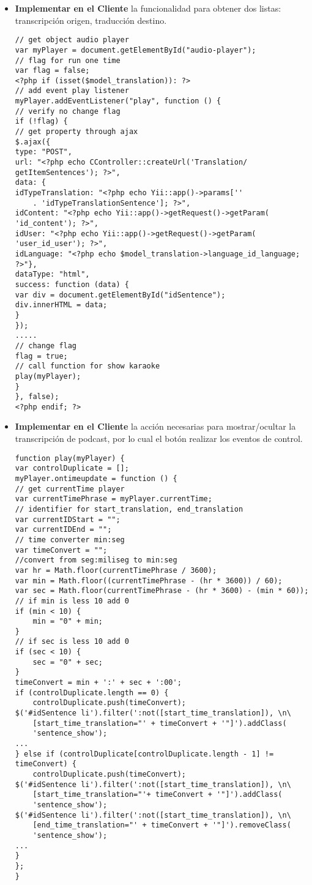 \begin{itemize}

\item \textbf{Implementar en el Cliente} la funcionalidad para obtener dos
listas: transcripción origen, traducción destino.

\begin{lstlisting}[caption={Llenado de elementos en subtitulado.}, label={lst:fillSubtitle}]
// get object audio player
var myPlayer = document.getElementById("audio-player");
// flag for run one time
var flag = false;
<?php if (isset($model_translation)): ?>
// add event play listener
myPlayer.addEventListener("play", function () {
// verify no change flag
if (!flag) {
// get property through ajax
$.ajax({
type: "POST",
url: "<?php echo CController::createUrl('Translation/
getItemSentences'); ?>",
data: {
idTypeTranslation: "<?php echo Yii::app()->params[''
    . 'idTypeTranslationSentence']; ?>",
idContent: "<?php echo Yii::app()->getRequest()->getParam(
'id_content'); ?>",
idUser: "<?php echo Yii::app()->getRequest()->getParam(
'user_id_user'); ?>",
idLanguage: "<?php echo $model_translation->language_id_language; 
?>"},
dataType: "html",
success: function (data) {
var div = document.getElementById("idSentence");
div.innerHTML = data;
}
});
.....
// change flag
flag = true;
// call function for show karaoke
play(myPlayer);
}
}, false);
<?php endif; ?>
\end{lstlisting}

\item \textbf{Implementar en el Cliente} la acción necesarias para
mostrar/ocultar la transcripción de podcast, por lo cual el botón realizar los
eventos de control.  

\begin{lstlisting}[caption={Control de Mostrar/Ocultar subtitulado.}]
function play(myPlayer) {
var controlDuplicate = [];
myPlayer.ontimeupdate = function () {
// get currentTime player
var currentTimePhrase = myPlayer.currentTime;
// identifier for start_translation, end_translation
var currentIDStart = "";
var currentIDEnd = "";
// time converter min:seg
var timeConvert = "";
//convert from seg:miliseg to min:seg
var hr = Math.floor(currentTimePhrase / 3600);
var min = Math.floor((currentTimePhrase - (hr * 3600)) / 60);
var sec = Math.floor(currentTimePhrase - (hr * 3600) - (min * 60));
// if min is less 10 add 0
if (min < 10) {
    min = "0" + min;
}
// if sec is less 10 add 0
if (sec < 10) {
    sec = "0" + sec;
}
timeConvert = min + ':' + sec + ':00';
if (controlDuplicate.length == 0) {
    controlDuplicate.push(timeConvert);
$('#idSentence li').filter(':not([start_time_translation]), \n\
    [start_time_translation="' + timeConvert + '"]').addClass(
    'sentence_show');
...
} else if (controlDuplicate[controlDuplicate.length - 1] != 
timeConvert) {
    controlDuplicate.push(timeConvert);
$('#idSentence li').filter(':not([start_time_translation]), \n\
    [start_time_translation="'+ timeConvert + '"]').addClass(
    'sentence_show');
$('#idSentence li').filter(':not([start_time_translation]), \n\
    [end_time_translation="' + timeConvert + '"]').removeClass(
    'sentence_show');
...
}
};
}     
\end{lstlisting}


\end{itemize}
